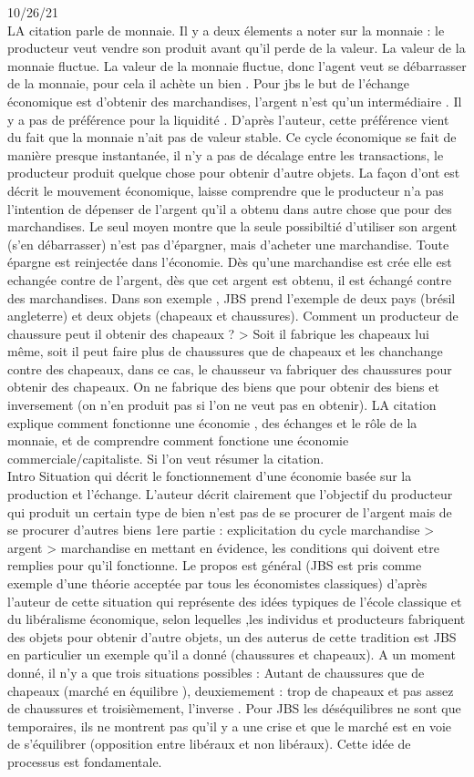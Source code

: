 \documentclass{article}
\begin{document}
10/26/21 \\
LA citation parle de monnaie. Il y a deux élements a noter sur la monnaie : le producteur veut vendre son produit avant qu'il perde de la valeur. La valeur de la monnaie fluctue. La valeur de la monnaie fluctue, donc l'agent veut se débarrasser de la monnaie, pour cela il achète un bien	. Pour jbs le but de l'échange économique est d'obtenir des marchandises, l'argent n'est qu'un intermédiaire . Il y a pas de préférence pour la liquidité . D'après l'auteur, cette préférence vient du fait que la monnaie n'ait pas de valeur stable.
Ce cycle économique se fait de manière presque instantanée, il n'y a pas de décalage entre les transactions, le producteur produit quelque chose pour obtenir d'autre objets. La façon d'ont est décrit le mouvement économique, laisse comprendre que le producteur n'a pas l'intention de dépenser de l'argent qu'il a obtenu dans autre chose que pour des marchandises. Le seul moyen montre que la seule possibiltié d'utiliser son argent (s'en débarrasser) n'est pas d'épargner, mais d'acheter une marchandise. Toute épargne est reinjectée dans l'économie. Dès qu'une marchandise est crée elle est echangée contre de l'argent, dès que cet argent est obtenu, il est échangé contre des marchandises. Dans son exemple , JBS prend l'exemple de deux pays (brésil angleterre) et deux objets (chapeaux et chaussures). Comment un producteur de chaussure peut il obtenir des chapeaux ? > Soit il fabrique les chapeaux lui même, soit il peut faire plus de chaussures que de chapeaux et les chanchange contre des chapeaux, dans ce cas, le chausseur va fabriquer des chaussures pour obtenir des chapeaux. On ne fabrique des biens que pour obtenir des biens et inversement (on n'en produit pas si l'on ne veut pas en obtenir). LA citation explique comment fonctionne une économie , des échanges et le rôle de la monnaie, et de comprendre comment fonctione une économie commerciale/capitaliste. Si l'on veut résumer la citation.\\
Intro
Situation qui décrit le fonctionnement d'une économie basée sur la production et l'échange. L'auteur décrit clairement que l'objectif du producteur qui produit un certain type de bien n'est pas de se procurer de l'argent mais de se procurer d'autres biens
1ere partie : explicitation du cycle marchandise > argent > marchandise en mettant en évidence, les conditions qui doivent etre remplies pour qu'il fonctionne. Le propos est général (JBS est pris comme exemple d'une théorie acceptée par tous les économistes classiques)
d'après l'auteur de cette situation qui représente des idées typiques de l'école classique et du libéralisme économique, selon lequelles ,les individus et producteurs fabriquent des objets pour obtenir d'autre objets, un des auterus de cette tradition est JBS en particulier un exemple qu'il a donné (chaussures et chapeaux). A un moment donné, il n'y a que trois situations possibles : Autant de chaussures que de chapeaux (marché en équilibre ), deuxiemement : trop de chapeaux et pas assez de chaussures  et troisièmement, l'inverse  . Pour JBS les déséquilibres ne sont que temporaires, ils ne montrent pas qu'il y a une crise et que le marché est en voie de s'équilibrer (opposition entre libéraux et non libéraux). Cette idée de processus est fondamentale.
\end{document}

